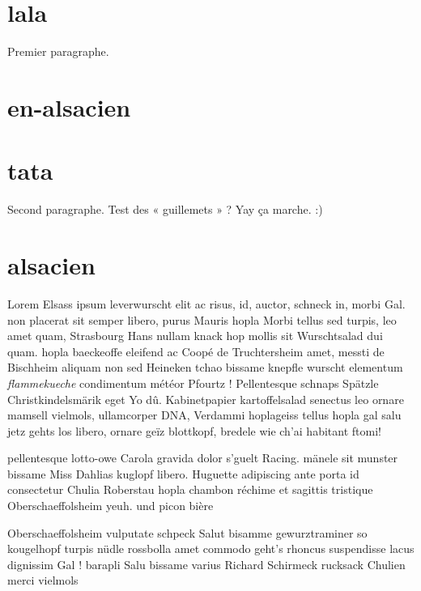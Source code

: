 \section{lala}
Premier paragraphe.

\section{en-alsacien}

\section{tata}
Second paragraphe. Test des « guillemets » ? Yay ça marche. :)

\section{alsacien}
Lorem Elsass ipsum leverwurscht elit ac risus, id, auctor, schneck in, morbi Gal. non placerat sit semper libero, purus Mauris hopla Morbi tellus sed turpis, leo amet quam, Strasbourg Hans nullam knack hop mollis sit Wurschtsalad dui quam. hopla baeckeoffe eleifend ac Coopé de Truchtersheim amet, messti de Bischheim aliquam non sed Heineken tchao bissame knepfle wurscht elementum \textit{flammekueche} condimentum météor Pfourtz ! Pellentesque schnaps Spätzle Christkindelsmärik eget Yo dû. Kabinetpapier kartoffelsalad senectus leo ornare mamsell vielmols, ullamcorper DNA, Verdammi hoplageiss tellus hopla gal salu jetz gehts los libero, ornare geïz blottkopf, bredele wie ch'ai habitant ftomi!

\bnw
\item pellentesque lotto-owe Carola gravida dolor s'guelt Racing. mänele sit munster bissame Miss Dahlias kuglopf libero. Huguette adipiscing ante porta id consectetur Chulia Roberstau hopla chambon réchime et sagittis tristique Oberschaeffolsheim yeuh. und picon bière 
\item Oberschaeffolsheim vulputate schpeck Salut bisamme gewurztraminer so kougelhopf turpis nüdle rossbolla amet commodo geht's rhoncus suspendisse lacus dignissim Gal ! barapli Salu bissame varius Richard Schirmeck rucksack Chulien merci vielmols 
\enw